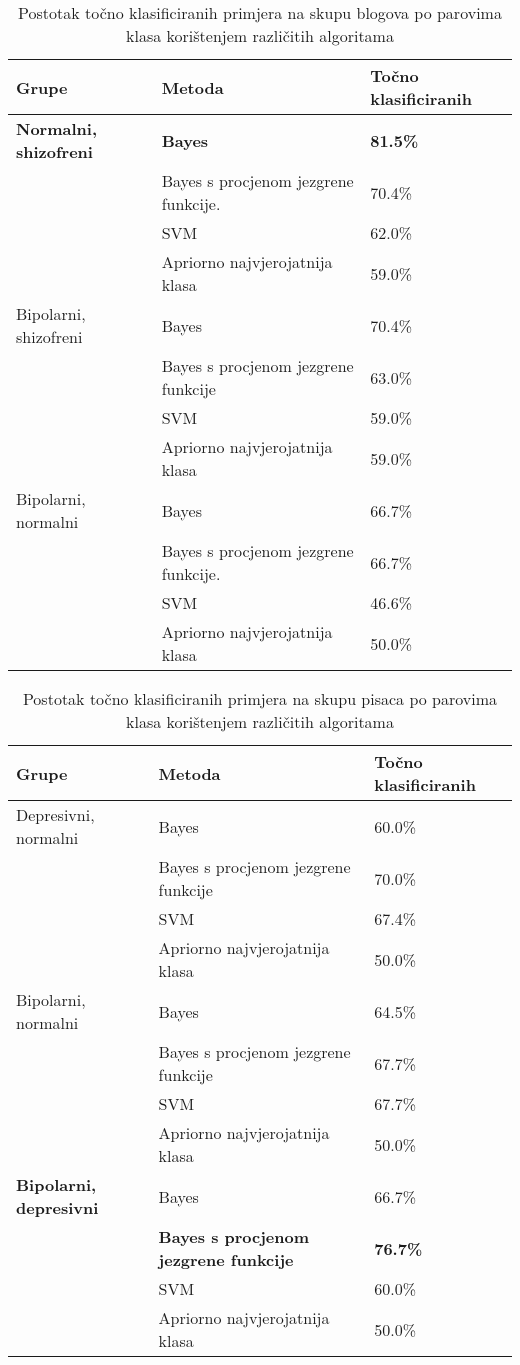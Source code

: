 \documentclass[10pt, a4paper]{article}
\begin{document}
\begin{table*}
\caption{Postotak točno klasificiranih primjera na skupu blogova po parovima klasa korištenjem različitih algoritama}
\label{lab:rezultatiBlogGrupa}
\begin{center}
\begin{tabular}{lll}
\toprule
Grupe & Metoda & Točno klasificiranih\\
\midrule
\textbf{Normalni, shizofreni} & \textbf{Bayes} & \textbf{81.5\%}\\
 & Bayes s procjenom jezgrene funkcije. & 70.4\%\\
 & SVM & 62.0\%\\
 & Apriorno najvjerojatnija klasa & 59.0\%\\
\midrule
 Bipolarni, shizofreni &  Bayes &  70.4\%\\
 & Bayes s procjenom jezgrene funkcije & 63.0\%\\
 & SVM & 59.0\%\\
 & Apriorno najvjerojatnija klasa & 59.0\%\\
\midrule
Bipolarni, normalni & Bayes & 66.7\%\\
 & Bayes s procjenom jezgrene funkcije. & 66.7\%\\
 & SVM & 46.6\%\\
 & Apriorno najvjerojatnija klasa & 50.0\%\\
 \bottomrule
 \end{tabular}
 \end{center}
 \end{table*}
\begin{table*}
\caption{Postotak točno klasificiranih primjera na skupu pisaca po parovima klasa korištenjem različitih algoritama}
\label{tab:rezultPisciGrupa}
\begin{center}
\begin{tabular}{lll}
\toprule
Grupe & Metoda & Točno klasificiranih\\
\midrule
Depresivni, normalni & Bayes & 60.0\%\\
 & Bayes s procjenom jezgrene funkcije & 70.0\%\\
 & SVM & 67.4\%\\
  & Apriorno najvjerojatnija klasa & 50.0\%\\
\midrule
Bipolarni, normalni & Bayes & 64.5\%\\
 & Bayes s procjenom jezgrene funkcije & 67.7\%\\
 & SVM & 67.7\%\\
  & Apriorno najvjerojatnija klasa & 50.0\%\\
\midrule
 \textbf{Bipolarni, depresivni} &  Bayes &  66.7\%\\
 &  \textbf{Bayes s procjenom jezgrene funkcije} &  \textbf{76.7\%}\\
  & SVM & 60.0\%\\
   & Apriorno najvjerojatnija klasa & 50.0\%\\
\bottomrule
\end{tabular}
\end{center}
\end{table*}
\end{document}
